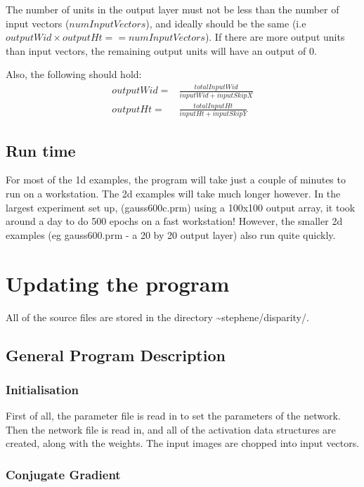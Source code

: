 \documentclass[a4paper]{article}
\begin{document}
The number of units in the output layer must not be less than the
number of input vectors ($numInputVectors$), and ideally should be the
same (i.e $outputWid \times outputHt == numInputVectors$).  If there
are more output units than input vectors, the remaining output units
will have an output of 0.

Also, the following should hold:
\begin{align*}
outputWid = & \frac{totalInputWid}{inputWid + inputSkipX} \\
outputHt = & \frac{totalInputHt}{inputHt + inputSkipY}
\end{align*}


\subsection{Run time}

For most of the 1d examples, the program will take just a couple of
minutes to run on a workstation. The 2d examples will take much longer
however.    In the largest experiment set up, (gauss600c.prm) using a
100x100 output array, it took around a day to do 500 epochs on a fast
workstation!  However, the smaller 2d examples (eg gauss600.prm - a 20
by 20 output layer) also run quite quickly.



\section{Updating the program}

All of the source files are stored in  the directory
\~{}stephene/disparity/.  

\subsection{General Program Description}

\subsubsection{Initialisation}

First of all, the parameter file is read in to set the parameters of
the network.  Then the network file is read in, and all of the
activation data structures are created, along with the weights.  The
input images are chopped into input vectors.

\subsubsection{Conjugate Gradient}
\end{document}
